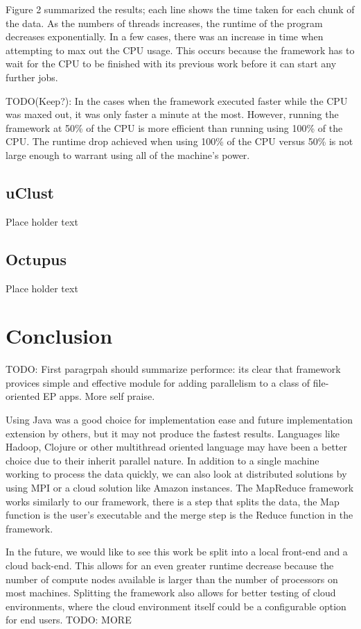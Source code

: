 \documentclass[12pt]{article}
\begin{document}
Figure 2 summarized the results; each line shows the time taken for each chunk
of the data.
As the numbers of threads increases, the runtime of the program decreases 
exponentially. In a few cases, there was an increase in time when attempting to 
max out the CPU usage. This occurs because the framework has to wait for the 
CPU to be finished with its previous work before it can start any 
further jobs. 

TODO(Keep?): In the cases when the framework executed faster while the CPU was 
maxed out, it was only faster a minute at the most. However, running the 
framework at 50\% of the CPU is more efficient than running using 100\% of the 
CPU. The runtime drop achieved when using 100\% of the CPU versus 50\% is not 
large enough to warrant using all of the machine's power.

\subsection{uClust}

Place holder text

\subsection{Octupus}

Place holder text

\section{Conclusion}

TODO: First paragrpah should summarize performce: its clear that framework
provices simple and effective module for adding parallelism to a class of
file-oriented EP apps. More self praise.

Using Java was a good choice for implementation ease and future implementation
extension by others, but it may not produce the fastest results. Languages like
Hadoop, Clojure or other multithread oriented language may have been a better
choice due to their inherit parallel nature. In addition to a single machine
working to process the data quickly, we can also look at distributed solutions
by using MPI or a cloud solution like Amazon instances. The MapReduce framework
works similarly to our framework, there is a step that splits the data, the Map
function is the user's executable and the merge step is the Reduce function in
the framework. 

In the future, we would like to see this work be split into a
local front-end and a cloud back-end. This allows for an even greater runtime
decrease because the number of compute nodes available is larger than the number
of processors on most machines. Splitting the framework also allows for better
testing of cloud environments, where the cloud environment itself could be a
configurable option for end users.
TODO: MORE
\end{document}
